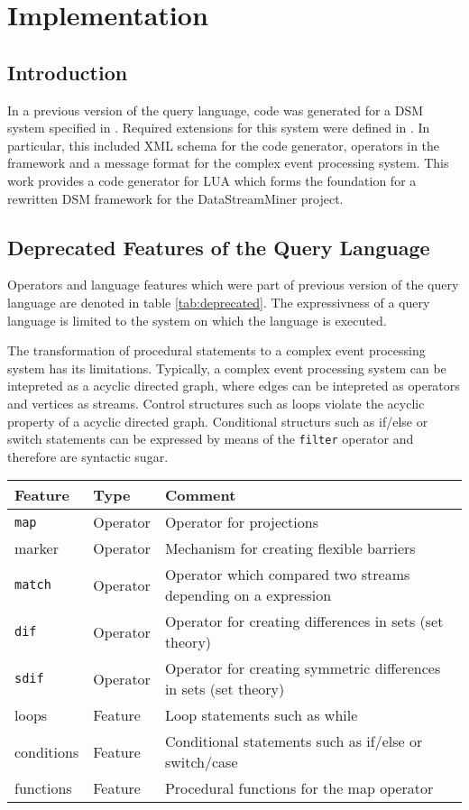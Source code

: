 \section{Implementation}
\subsection{Introduction}
In a previous version of the query language, code was generated for a DSM system
specified in \cite{285:Fischer2010}. Required extensions for this system were 
defined in \cite{297:Frey2010}. In particular, this included XML schema for the 
code generator, operators in the framework and a message format for the complex 
event processing system. This work provides a code generator for LUA which forms
the foundation for a rewritten DSM framework for the DataStreamMiner project.

\subsection{Deprecated Features of the Query Language}
Operators and language features which were part of previous version of the query
language are denoted in table \ref{tab:deprecated}. The expressivness of a query
language is limited to the system on which the language is executed.

The transformation of procedural statements to a complex event processing system
has its limitations. Typically, a complex event processing system can be 
intepreted as a acyclic directed graph, where edges can be intepreted as 
operators and vertices as streams. Control structures such as loops violate the
acyclic property of a acyclic directed graph. Conditional structurs such as 
if/else or switch statements can be expressed by means of the \texttt{filter}
operator and therefore are syntactic sugar. 
\begin{center}
  \begin{tabular}{|l|l|l|}
  \hline
  \textbf{Feature} & \textbf{Type} & \textbf{Comment} \\
  \hline
  \hline
  \texttt{map} & Operator & Operator for projections \\
  \hline
  marker & Operator & Mechanism for creating flexible barriers \\
  \hline
  \texttt{match} & Operator & Operator which compared two streams depending on a expression \\
  \hline
  \texttt{dif} & Operator & Operator for creating differences in sets (set theory) \\
  \hline
  \texttt{sdif} & Operator & Operator for creating symmetric differences in sets (set theory) \\
  \hline
  loops & Feature & Loop statements such as while  \\
  \hline
  conditions & Feature & Conditional statements such as if/else or switch/case \\
  \hline
  functions & Feature & Procedural functions for the map operator \\
  \hline
  \end{tabular}
  \label{tab:deprecated}
\end{center}

